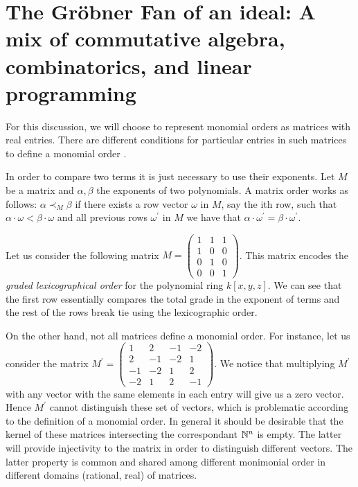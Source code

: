 \section{The Gr\"obner Fan of an ideal: A mix of commutative algebra,
  combinatorics, and linear programming}

For this discussion, we will choose to represent monomial orders as matrices with
real entries. There are different conditions for particular entries in such matrices
to define a monomial order \cite{Cox:2014}.

In order to compare two terms it is just necessary to use their exponents. Let $M$
be a matrix and $\alpha, \beta$ the exponents of two polynomials.
A matrix order works as follows: $\alpha \prec_M \beta$
if there exists a row vector $\omega$ in $M$, say the ith row, such that
$\alpha \cdot \omega < \beta \cdot \omega$ and all previous rows $\omega^{'}$ in $M$
we have that $\alpha \cdot \omega^{'} = \beta \cdot \omega^{'}$.

\begin{example} Let us consider the following matrix
  $M = \begin{pmatrix} 1 & 1 & 1 \\
    1 & 0 & 0 \\
    0 & 1 & 0 \\
    0 & 0 & 1 \end{pmatrix}$. This matrix encodes the \emph{graded lexicographical
    order} for the polynomial ring $k[x, y, z]$. We can see that the first row
  essentially compares the total grade in the exponent of terms and the rest
  of the rows break tie using the lexicographic order.
\end{example}

\begin{example}
  On the other hand, not all matrices define a monomial order. For instance, let
  us consider the matrix $M^{'} = \begin{pmatrix} 1 & 2 & -1 & -2 \\
    2 & -1 & -2 & 1 \\
    -1 & -2 & 1 & 2 \\
    -2 & 1 & 2 & -1
  \end{pmatrix}$. We notice that multiplying $M^{'}$ with any vector with the same elements in each
  entry will give us a zero vector. Hence $M^{'}$ cannot distinguish
  these set of vectors, which is problematic according to the definition
  of a monomial order. In general it should be desirable that the kernel
  of these matrices intersecting the correspondant $\mathbb{N}^n$ is empty.
  The latter will provide injectivity to the matrix in order to distinguish
  different vectors. The latter property is common and shared among different
  monimonial order in different domains (rational, real) of matrices.
\end{example}

